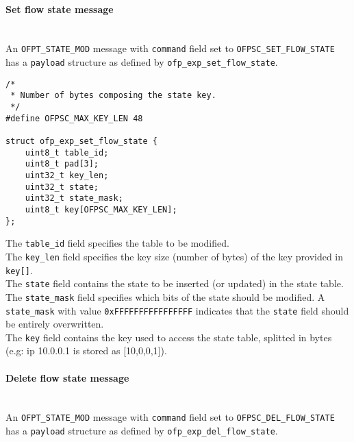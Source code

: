 
\paragraph{Set flow state message}\mbox{}\\
An \texttt{OFPT\_STATE\_MOD} message with \texttt{command} field set to \texttt{OFPSC\_SET\_FLOW\_STATE} has a \texttt{payload} structure as defined by \texttt{ofp\_exp\_set\_flow\_state}.

\scriptsize\begin{verbatim}
/*
 * Number of bytes composing the state key.
 */
#define OFPSC_MAX_KEY_LEN 48

struct ofp_exp_set_flow_state {
    uint8_t table_id;
    uint8_t pad[3];
    uint32_t key_len;
    uint32_t state;
    uint32_t state_mask;
    uint8_t key[OFPSC_MAX_KEY_LEN];
};
\end{verbatim}\normalsize
The \texttt{table\_id} field specifies the table to be modified.
\\
The \texttt{key\_len} field specifies the key size (number of bytes) of the key provided in \texttt{key[]}.
\\
The \texttt{state} field contains the state to be inserted (or updated) in the state table. 
\\
The \texttt{state\_mask} field specifies which bits of the state should be modified. A \texttt{state\_mask} with value \texttt{0xFFFFFFFFFFFFFFFF} indicates that the \texttt{state} field should be entirely overwritten.
\\
The \texttt{key} field contains the key used to access the state table, splitted in bytes (e.g: ip 10.0.0.1 is stored as [10,0,0,1]).

\paragraph{Delete flow state message}\mbox{}\\
An \texttt{OFPT\_STATE\_MOD} message with \texttt{command} field set to \texttt{OFPSC\_DEL\_FLOW\_STATE} has a \texttt{payload} structure as defined by \texttt{ofp\_exp\_del\_flow\_state}.


